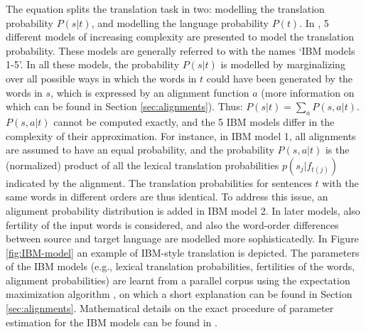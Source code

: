 \documentclass{report}
\theoremstyle{definition}
\theoremstyle{plain}
\begin{document}
The equation splits the translation task in two: modelling the translation probability $P(s|t)$, and modelling the language probability $P(t)$. In \cite{brown1993mathematics}, 5 different models of increasing complexity are presented to model the translation probability. These models are generally referred to with the names `IBM models 1-5'. In all these models, the probability $P(s|t)$ is modelled by marginalizing over all possible ways in which the words in $t$ could have been generated by the words in $s$, which is expressed by an alignment function $a$ (more information on which can be found in Section \ref{sec:alignments}). Thus: $P(s|t) = \sum_a P(s,a|t)$. $P(s,a|t)$ cannot be computed exactly, and the 5 IBM models differ in the complexity of their approximation. For instance, in IBM model 1, all alignments are assumed to have an equal probability, and the probability $P(s,a|t)$ is the (normalized) product of all the lexical translation probabilities $p(s_j|f_{t(j)})$ indicated by the alignment. The translation probabilities for sentences $t$ with the same words in different orders are thus identical. To address this issue, an alignment probability distribution is added in IBM model 2. In later models, also fertility of the input words is considered, and also the word-order differences between source and target language are modelled more sophisticatedly. In Figure \ref{fig:IBM-model} an example of IBM-style translation is depicted. The parameters of the IBM models (e.g., lexical translation probabilities, fertilities of the words, alignment probabilities) are learnt from a parallel corpus using the expectation maximization algorithm \citep{dempster1977maximum}, on which a short explanation can be found in Section \ref{sec:alignments}. Mathematical details on the exact procedure of parameter estimation for the IBM models can be found in \cite{brown1993mathematics}.
\end{document}

